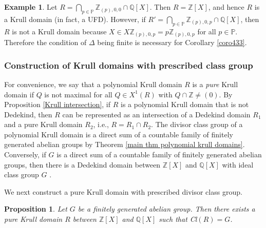 \documentclass[10pt]{article}
\numberwithin{equation}{section}
\newtheorem{Prop}[equation]{Proposition}
\theoremstyle{definition}
\newtheorem{Ex}[equation]{Example}
\theoremstyle{definition}
\newcommand{\Q}{\mathbb{Q}}
\newcommand{\Z}{\mathbb{Z}}
\newcommand{\PP}{\mathbb{P}}
\begin{document}
\begin{Ex}
Let $R = \bigcap\limits_{p \in \PP}\Z_{(p), 0, 0} \cap \Q[X]$. Then $R = \Z[X]$, and hence $R$ is a Krull domain (in fact, a UFD). However, if $R'= \bigcap\limits_{p \in \PP}\Z_{(p), 0, p} \cap \Q[X]$, then $R$ is not a Krull domain because $X \in X\Z_{(p), 0, p} = p\Z_{(p), 0, p}$ for all $p \in \PP$. Therefore the condition of $\Delta$ being finite is necessary for Corollary \ref{coro433}.  
\end{Ex}


\subsubsection{Construction of Krull domains with prescribed class group}\label{section: construction Krull}


For convenience, we say that a polynomial Krull domain $R$ is a \emph{pure} Krull domain if $Q$ is not maximal for all $Q \in X^1(R)$ with $Q \cap \Z \neq (0)$. By Proposition \ref{Krull intersection}, if $R$ is a polynomial Krull domain that is not Dedekind, then $R$ can be represented as an intersection of a Dedekind domain $R_1$ and a pure Krull domain $R_2$, i.e., $R = R_1 \cap R_2$. 
The divisor class group of a polynomial Krull domain is a direct sum of a countable family of finitely generated abelian groups by Theorem \ref{main thm polynomial krull domains}. Conversely, if $G$ is a direct sum of a countable family of finitely generated abelian groups, then there is a Dedekind domain between $\Z[X]$ and $\Q[X]$ with ideal class group $G$ \cite[Theorem 3.1]{PerDedekind}. 

We next construct a pure Krull domain with prescribed divisor class group.
 
\begin{Prop}\label{existence Krull local case}
Let $G$ be a finitely generated abelian group. Then there exists a pure Krull domain $R$ between $\Z[X]$ and $\Q[X]$ such that Cl$(R)=G$. 
\end{Prop}
\end{document}

